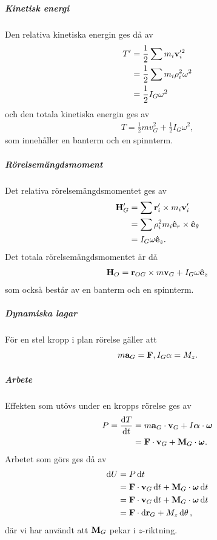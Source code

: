 \subparagraph{Kinetisk energi}
Den relativa kinetiska energin ges då av
\begin{align*}
	T' &= \frac{1}{2}\sum m_{i}\vb{v}_{i}'^{2} \\
	   &= \frac{1}{2}\sum m_{i}\rho_{i}^{2}\omega^{2} \\
	   &= \frac{1}{2}I_{G}\omega^{2}
\end{align*}
och den totala kinetiska energin ges av
\begin{align*}
	T = \frac{1}{2}mv_{G}^{2} + \frac{1}{2}I_{G}\omega^{2},
\end{align*}
som innehåller en banterm och en spinnterm.

\subparagraph{Rörelsemängdsmoment}
Det relativa rörelsemängdsmomentet ges av
\begin{align*}
	\vb{H}_{G}' &= \sum \vb{r}_{i}'\times m_{i}\vb{v}_{i}' \\
	            &= \sum \rho_{i}^{2} m_{i}\vu{e}_{r}\times\vu{e}_{\theta} \\
	            &= I_{G}\omega\vu{e}_{z}.
\end{align*}
Det totala rörelsemängdsmomentet är då
\begin{align*}
	\vb{H}_{O} = \vb{r}_{OG}\times m\vb{v}_{G} + I_{G}\omega\vu{e}_{z}
\end{align*}
som också består av en banterm och en spinnterm.

\subparagraph{Dynamiska lagar}
För en stel kropp i plan rörelse gäller att
\begin{align*}
	m\vb{a}_{G} = \vb{F}, I_{G}\alpha = M_{z}.
\end{align*}

\subparagraph{Arbete}
Effekten som utövs under en kropps rörelse ges av
\begin{align*}
	P = \dv{T}{t} &= m\vb{a}_{G}\cdot\vb{v}_{G} + I\vb*{\alpha}\cdot\vb*{\omega} \\
	              &= \vb{F}\cdot\vb{v}_{G} + \vb{M}_{G}\cdot\vb*{\omega}.
\end{align*}
Arbetet som görs ges då av
\begin{align*}
	\dd{U} &= P\dd{t} \\
	       &= \vb{F}\cdot\vb{v}_{G}\dd{t} + \vb{M}_{G}\cdot\vb*{\omega}\dd{t} \\
	       &= \vb{F}\cdot\vb{v}_{G}\dd{t} + \vb{M}_{G}\cdot\vb*{\omega}\dd{t} \\
	       &= \vb{F}\cdot\dd{\vb{r}_{G}} + M_{z}\dd{\theta},
\end{align*}
där vi har användt att $\vb{M}_{G}$ pekar i $z$-riktning.

